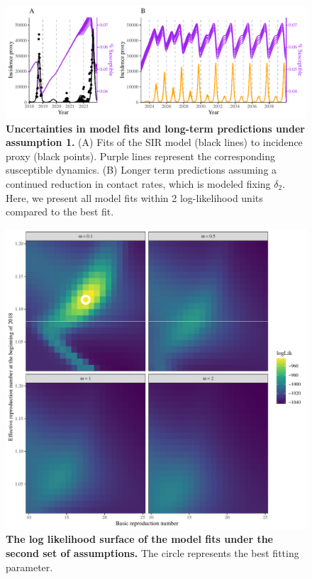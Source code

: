\documentclass[12pt]{article}
\begin{document}
\pagebreak

\begin{figure}[!th]
\includegraphics[width=\textwidth]{../figure_pub/figure2_alternative.pdf}
\caption{
\textbf{Uncertainties in model fits and long-term predictions under assumption 1.}
(A) Fits of the SIR model (black lines) to incidence proxy (black points).
Purple lines represent the corresponding susceptible dynamics.
(B) Longer term predictions assuming a continued reduction in contact rates, which is modeled fixing $\delta_2$.
Here, we present all model fits within 2 log-likelihood units compared to the best fit.
}
\end{figure}

\pagebreak

\begin{figure}[!th]
\includegraphics[width=\textwidth]{../figure_pub/figure2_logLik_2.pdf}
\caption{
\textbf{The log likelihood surface of the model fits under the second set of assumptions.}
The circle represents the best fitting parameter.
}
\end{figure}
\end{document}
